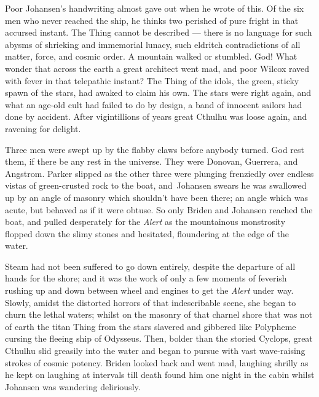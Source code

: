 Poor Johansen's handwriting almost gave out when he wrote of this. Of
the six men who never reached the ship, he thinks two perished of pure
fright in that accursed instant. The Thing cannot be described --- there
is no language for such abysms of shrieking and immemorial lunacy, such
eldritch contradictions of all matter, force, and cosmic order. A
mountain walked or stumbled. God! What wonder that across the earth a
great architect went mad, and poor Wilcox raved with fever in that
telepathic instant? The Thing of the idols, the green, sticky spawn of
the stars, had awaked to claim his own. The stars were right again, and
what an age-old cult had failed to do by design, a band of innocent
sailors had done by accident. After vigintillions of years great Cthulhu
was loose again, and ravening for delight.

Three men were swept up by the flabby claws before anybody turned. God
rest them, if there be any rest in the universe. They were Donovan,
Guerrera, and Angstrom. Parker slipped as the other three were plunging
frenziedly over endless vistas of green-crusted rock to the boat, and\est\
Johansen swears he was swallowed up by an angle of masonry which
shouldn't have been there; an angle which was acute, but behaved as if
it were obtuse. So only Briden and Johansen reached the boat, and pulled
desperately for the \emph{Alert} as the mountainous monstrosity flopped down
the slimy stones and hesitated, floundering at the edge of the water.

Steam had not been suffered to go down entirely, despite the departure
of all hands for the shore; and it was the work of only a few moments of
feverish rushing up and down between wheel and engines to get the \emph{Alert}
under way. Slowly, amidst the distorted horrors of that indescribable
scene, she began to churn the lethal waters; whilst on the masonry of
that charnel shore that was not of earth the titan Thing from the stars
slavered and gibbered like Polypheme cursing the fleeing ship of
Odysseus. Then, bolder than the storied Cyclops, great Cthulhu slid
greasily into the water and began to pursue with vast wave-raising
strokes of cosmic potency. Briden looked back and went mad, laughing
shrilly as he kept on laughing at intervals till death found him one
night in the cabin whilst Johansen was wandering deliriously.

